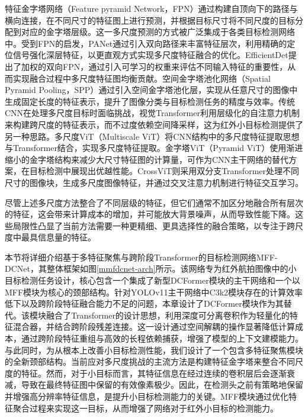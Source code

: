 特征金字塔网络（Feature pyramid Network，FPN）\cite{FPN}通过构建自顶向下的路径与横向连接，在不同尺寸的特征图上进行预测，并根据目标尺寸将不同尺度的目标分配到对应的金字塔层级。这一多尺度预测的方式被广泛集成于各类目标检测网络中。受到FPN的启发，PANet\cite{Liu2018PANet}通过引入双向路径来丰富特征层次，利用精确的定位信号强化深层特征，以更直观方式实现多尺度特征融合的优化。EfficientDet\cite{TanEfficientDet}提出了加权的双向FPN，通过引入可学习的权重来评估不同输入特征的重要性，从而实现融合过程中多尺度特征图均衡贡献。空间金字塔池化网络（Spatial Pyramid Pooling，SPP）\cite{He2015SPP}通过引入空间金字塔池化层，实现从任意尺寸的图像中生成固定长度的特征表示，提升了图像分类与目标检测任务的精度与效率。传统CNN在处理多尺度目标时面临挑战，视觉Transformer利用层级化的自注意力机制来构建跨尺度的特征表示，而不过度依赖空间降采样，这为红外小目标检测提供了另一种思路。多尺度ViT（Multiscale ViT\cite{Fan2021MultiscaleViT}）将CNN结构中的多尺度特征提取思想与Transformer结合，实现多尺度特征提取。金字塔ViT（Pyramid ViT\cite{Wang2021PyramidViT}）使用渐进缩小的金字塔结构来减少大尺寸特征图的计算量，可作为CNN主干网络的替代方案，在目标检测中展现出优越性能。CrossViT\cite{Chen2021CrossViT}则采用双分支Transformer处理不同尺寸的图像块，生成多尺度图像特征，并通过交叉注意力机制进行特征交互学习。

尽管上述多尺度方法整合了不同层级的特征，但它们通常不加区分地融合所有层次的特征，这会带来计算成本的增加，并可能放大背景噪声，从而导致性能下降。这些局限性凸显了当前方法需要一种更精细、更具选择性的融合策略，以专注于跨尺度中最具信息量的特征。

本节将详细介绍基于多特征聚焦与跨阶段Transformer的目标检测网络MFF-DCNet，其整体框架如图\ref{mmfdcnet-arch}所示。该网络专为红外航拍图像中的小目标检测任务设计，核心包含一个集成了新型DCFormer模块的主干网络和一个以MFF模块为核心的颈部结构。针对YOLOv11主干网络中C3k2模块存在的计算效率低下以及跨阶段特征融合能力不足的问题，本章设计了DCFormer模块作为其替代。该模块融合了Transformer的设计思想，利用深度可分离卷积作为轻量化的特征混合器，并结合跨阶段残差连接。这一设计通过空间解耦的操作显著降低计算成本，通过跨阶段特征重组与高效的长程依赖捕获，增强了模型的上下文建模能力。与此同时，为从根本上改善小目标检测性能，我们设计了一个包含多特征聚焦模块的全新颈部结构。当前应对多尺度挑战的主流方法是构建特征金字塔来整合不同尺度的特征。然而，对于小目标而言，其特征信息在经过连续的卷积层后会逐渐衰减，导致在最终特征图中保留的有效像素极少。因此，在检测头之前有策略地保留并增强高分辨率特征信息，是提升小目标检测能力的关键。MFF模块通过优化特征聚合过程来实现这一目标，从而增强了网络对于红外小目标的检测能力。

